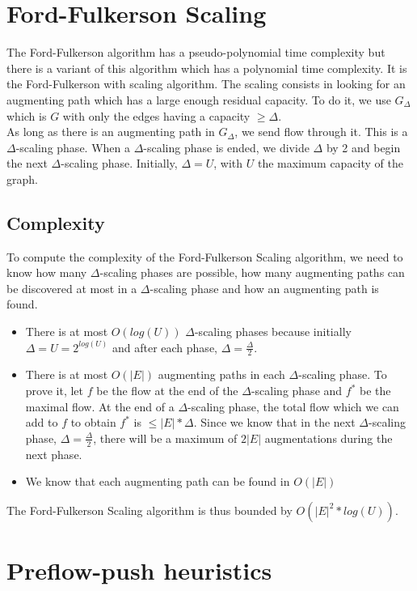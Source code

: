 \section{Ford-Fulkerson Scaling}
The Ford-Fulkerson algorithm has a pseudo-polynomial time complexity but there is a variant of this algorithm which has a polynomial time complexity. It is the Ford-Fulkerson with scaling algorithm. The scaling consists in looking for an augmenting path which has a large enough residual capacity. To do it, we use $G_\Delta$ which is $G$ with only the edges having a capacity $\geq \Delta$. \\

As long as there is an augmenting path in $G_\Delta$, we send flow through it. This is a $\Delta$-scaling phase. When a $\Delta$-scaling phase is ended, we divide $\Delta$ by 2 and begin the next $\Delta$-scaling phase. Initially, $\Delta = U$, with $U$ the maximum capacity of the graph.

\subsection{Complexity}
To compute the complexity of the Ford-Fulkerson Scaling algorithm, we need to know how many $\Delta$-scaling phases are possible, how many augmenting paths can be discovered at most in a $\Delta$-scaling phase and how an augmenting path is found.

\begin{itemize}
\item There is at most $O(log(U))$ $\Delta$-scaling phases because initially $\Delta = U = 2^{log(U)}$ and after each phase, $\Delta=\frac{\Delta}{2}$.
\item There is at most $O(|E|)$ augmenting paths in each $\Delta$-scaling phase. To prove it, let $f$ be the flow at the end of the $\Delta$-scaling phase and $f^*$ be the maximal flow. At the end of a $\Delta$-scaling phase, the total flow which we can add to $f$ to obtain $f^*$ is $\leq |E|*\Delta$. Since we know that in the next $\Delta$-scaling phase, $\Delta=\frac{\Delta}{2}$, there will be a maximum of $2|E|$ augmentations during the next phase.
\item We know that each augmenting path can be found in $O(|E|)$
\end{itemize}

The Ford-Fulkerson Scaling algorithm is thus bounded by $O(|E|^2* log(U))$.

\section{Preflow-push heuristics}

